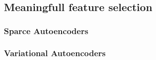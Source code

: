 \subsection{Meaningfull feature selection}\label{cha:sae}
\subsubsection{Sparce Autoencoders}\label{cha:vae}
\subsubsection{Variational Autoencoders}\label{cha:vae}
